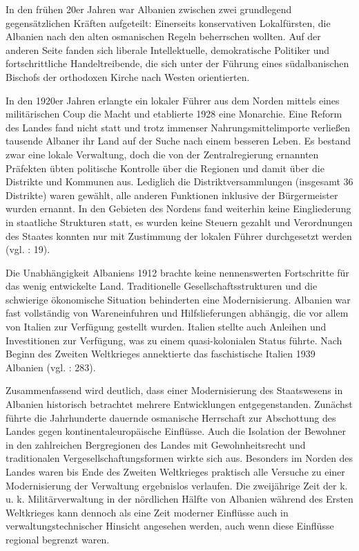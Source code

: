 In den frühen 20er Jahren war Albanien zwischen zwei grundlegend gegensätzlichen Kräften aufgeteilt: Einerseits konservativen Lokalfürsten, die Albanien nach den alten osmanischen Regeln beherrschen wollten. Auf der anderen Seite fanden sich liberale Intellektuelle, demokratische Politiker und fortschrittliche Handeltreibende, die sich unter der Führung eines südalbanischen Bischofs der orthodoxen Kirche nach Westen orientierten.\par
In den 1920er Jahren erlangte ein lokaler Führer aus dem Norden mittels eines militärischen Coup die Macht und etablierte 1928 eine Monarchie. Eine Reform des Landes fand nicht statt und trotz immenser Nahrungsmittelimporte verließen tausende Albaner ihr Land auf der Suche nach einem besseren Leben. Es bestand zwar eine lokale Verwaltung, doch die von der Zentralregierung ernannten Präfekten übten politische Kontrolle über die Regionen und damit über die Distrikte und Kommunen aus. Lediglich die Distriktversammlungen (insgesamt 36 Distrikte) waren gewählt, alle anderen Funktionen inklusive der Bürgermeister wurden ernannt. In den Gebieten des Nordens fand weiterhin keine Eingliederung in staatliche Strukturen statt, es wurden keine Steuern gezahlt und Verordnungen des Staates konnten nur mit Zustimmung der lokalen Führer durchgesetzt werden (vgl. \cite{biber}: 19).\par
Die Unabhängigkeit Albaniens 1912 brachte keine nennenswerten Fortschritte für das wenig entwickelte Land. Traditionelle Gesellschaftsstrukturen und die schwierige ökonomische Situation behinderten eine Modernisierung. Albanien war fast vollständig von Wareneinfuhren und Hilfslieferungen abhängig, die vor allem von Italien zur Verfügung gestellt wurden. Italien stellte auch Anleihen und Investitionen zur Verfügung, was zu einem quasi-kolonialen Status führte. Nach Beginn des Zweiten Weltkrieges annektierte das faschistische Italien 1939 Albanien (vgl. \cite{fisch84}: 283).
\par
Zusammenfassend wird deutlich, dass einer Modernisierung des Staatswesens in Albanien historisch betrachtet mehrere Entwicklungen entgegenstanden. Zunächst führte die Jahrhunderte dauernde osmanische Herrschaft zur Abschottung des Landes gegen kontinentaleuropäische Einflüsse. Auch die Isolation der Bewohner in den zahlreichen Bergregionen des Landes mit Gewohnheitsrecht und traditionalen Vergesellschaftungsformen wirkte sich aus. Besonders im Norden des Landes waren bis Ende des Zweiten Weltkrieges praktisch alle Versuche zu einer Modernisierung der Verwaltung ergebnislos verlaufen. Die zweijährige Zeit der k. u. k. Militärverwaltung in der nördlichen Hälfte von Albanien während des Ersten Weltkrieges kann dennoch als eine Zeit moderner Einflüsse auch in verwaltungstechnischer Hinsicht angesehen werden, auch wenn diese Einflüsse regional begrenzt waren.\par
